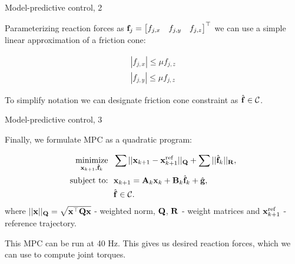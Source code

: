 \documentclass{beamer}
\begin{document}
\begin{frame}{Model-predictive control, 2}
	\begin{flushleft}
		
		Parameterizing reaction forces as $\mathbf{f}_j = \begin{bmatrix}
			f_{j, x} & f_{j, y} & f_{j, z}
		\end{bmatrix}^\top$ 
		we can use a simple linear approximation of a friction cone:
		
		\begin{align}
			| f_{j, x} | \leq  \mu f_{j, z} 
			\\
			| f_{j, y} | \leq \mu f_{j, z} 
		\end{align}
	
		To simplify notation we can designate friction cone constraint as $\hat{\mathbf{f}} \in \mathcal{C}$.
	
		
		
	\end{flushleft}
\end{frame}



\begin{frame}{Model-predictive control, 3}
	\begin{flushleft}
		
		Finally, we formulate MPC as a quadratic program:
		
		\begin{align*}
			\underset{\bo{x}_{k+1}, \hat{\bo{f}}_k}{\text{minimize}}
			 & \ \ \sum || \bo{x}_{k+1} - \bo{x}_{k+1}^\text{ref} ||_\bo{Q} +
			         \sum || \hat{\bo{f}}_k ||_\bo{R},
			\\
			\text{subject to:} & \ \ 
			\bo{x}_{k+1} = \bo{A}_k \bo{x}_k + \bo{B}_k \hat{\bo{f}}_k + \hat{\bo{g}},
			\\
			& \ \ \hat{\bo{f}} \in \mathcal{C}.
		\end{align*}
		where $|| \mathbf{x} ||_{\mathbf{Q}} = \sqrt{\mathbf{x}^\top \mathbf{Q} \mathbf{x}} $ - weighted norm, $\mathbf{Q}$, $\mathbf{R}$ - weight matrices and $\mathbf{x}_{k+1}^\text{ref}$ - reference trajectory.
		
		\bigskip
		
		This MPC can be run at 40 Hz. This gives us desired reaction forces, which we can use to compute joint torques.
		
	\end{flushleft}
\end{frame}
\end{document}
